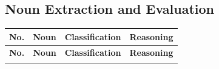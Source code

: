 \subsection{Noun Extraction and Evaluation}


\renewcommand{\arraystretch}{1.35}
\begin{longtable}{|>{\centering\arraybackslash}p{0.8cm}|p{3.1cm}|p{3.2cm}|p{8.0cm}|}
\hline
\textbf{No.} & \textbf{Noun} & \textbf{Classification} & \textbf{Reasoning} \\
\hline
\endfirsthead

\hline
\textbf{No.} & \textbf{Noun} & \textbf{Classification} & \textbf{Reasoning} \\
\hline
\endhead

\hline
\endfoot

\hline
\endlastfoot


\end{longtable}
